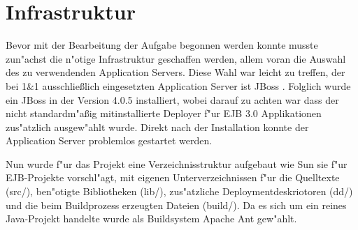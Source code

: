\section{Infrastruktur}
\label{sec:chap2:infra}

Bevor mit der Bearbeitung der Aufgabe begonnen werden konnte musste zun"achst die n"otige Infrastruktur
geschaffen werden, allem voran die Auswahl des zu verwendenden Application Servers. Diese Wahl war leicht
zu treffen, der bei 1\&1 ausschlie\ss lich eingesetzten Application Server ist JBoss \cite{JBOSSHP}.
Folglich wurde ein JBoss in der Version 4.0.5 installiert, wobei darauf zu achten war dass der
nicht standardm"a\ss ig mitinstallierte Deployer f"ur EJB 3.0 Applikationen zus"atzlich ausgew"ahlt wurde.
Direkt nach der Installation konnte der Application Server problemlos gestartet werden.

Nun wurde f"ur das Projekt eine Verzeichnisstruktur aufgebaut wie Sun sie f"ur EJB-Projekte vorschl"agt, mit
eigenen Unterverzeichnissen f"ur die Quelltexte (src/), ben"otigte Bibliotheken (lib/), zus"atzliche 
Deploymentdeskriotoren (dd/) und die beim Buildprozess erzeugten Dateien (build/).
Da es sich um ein reines Java-Projekt handelte wurde als Buildsystem Apache Ant \cite{ANTHP} gew"ahlt.


